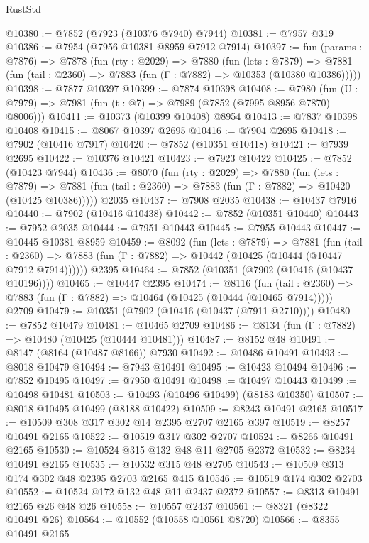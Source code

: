 \begin{lexlean}{RustStd}
\begin{coremodule}
@10380 := @7852 (@7923 (@10376 @7940) @7944)
@10381 := @7957 @319
@10386 := @7954 (@7956 @10381 @8959 @7912 @7914)
@10397 := fun (params : @7876) =>
  @7878
    (fun (rty : @2029) =>
    @7880
      (fun (lets : @7879) =>
      @7881 (fun (tail : @2360) => @7883 (fun (Γ : @7882) => @10353 (@10380 @10386)))))
@10398 := @7877 @10397
@10399 := @7874 @10398
@10408 := @7980 (fun (U : @7979) => @7981 (fun (t : @7) => @7989 (@7852 (@7995 @8956 @7870) @8006)))
@10411 := @10373 (@10399 @10408) @8954
@10413 := @7837 @10398 @10408
@10415 := @8067 @10397 @2695
@10416 := @7904 @2695
@10418 := @7902 (@10416 @7917)
@10420 := @7852 (@10351 @10418)
@10421 := @7939 @2695
@10422 := @10376 @10421
@10423 := @7923 @10422
@10425 := @7852 (@10423 @7944)
@10436 := @8070
    (fun (rty : @2029) =>
    @7880
      (fun (lets : @7879) =>
      @7881 (fun (tail : @2360) => @7883 (fun (Γ : @7882) => @10420 (@10425 @10386)))))
    @2035
@10437 := @7908 @2035
@10438 := @10437 @7916
@10440 := @7902 (@10416 @10438)
@10442 := @7852 (@10351 @10440)
@10443 := @7952 @2035
@10444 := @7951 @10443
@10445 := @7955 @10443
@10447 := @10445 @10381 @8959
@10459 := @8092
    (fun (lets : @7879) =>
    @7881
      (fun (tail : @2360) =>
      @7883 (fun (Γ : @7882) => @10442 (@10425 (@10444 (@10447 @7912 @7914))))))
    @2395
@10464 := @7852 (@10351 (@7902 (@10416 (@10437 @10196))))
@10465 := @10447 @2395
@10474 := @8116
    (fun (tail : @2360) => @7883 (fun (Γ : @7882) => @10464 (@10425 (@10444 (@10465 @7914)))))
    @2709
@10479 := @10351 (@7902 (@10416 (@10437 (@7911 @2710))))
@10480 := @7852 @10479
@10481 := @10465 @2709
@10486 := @8134 (fun (Γ : @7882) => @10480 (@10425 (@10444 @10481)))
@10487 := @8152 @48
@10491 := @8147 (@8164 (@10487 @8166)) @7930
@10492 := @10486 @10491
@10493 := @8018 @10479
@10494 := @7943 @10491
@10495 := @10423 @10494
@10496 := @7852 @10495
@10497 := @7950 @10491
@10498 := @10497 @10443
@10499 := @10498 @10481
@10503 := @10493 (@10496 @10499) (@8183 @10350)
@10507 := @8018 @10495 @10499 (@8188 @10422)
@10509 := @8243 @10491 @2165
@10517 := @10509 @308 @317 @302 @14 @2395 @2707 @2165 @397
@10519 := @8257 @10491 @2165
@10522 := @10519 @317 @302 @2707
@10524 := @8266 @10491 @2165
@10530 := @10524 @315 @132 @48 @11 @2705 @2372
@10532 := @8234 @10491 @2165
@10535 := @10532 @315 @48 @2705
@10543 := @10509 @313 @174 @302 @48 @2395 @2703 @2165 @415
@10546 := @10519 @174 @302 @2703
@10552 := @10524 @172 @132 @48 @11 @2437 @2372
@10557 := @8313 @10491 @2165 @26 @48 @26
@10558 := @10557 @2437
@10561 := @8321 (@8322 @10491 @26)
@10564 := @10552 (@10558 @10561 @8720)
@10566 := @8355 @10491 @2165

\end{coremodule}
\end{lexlean}
